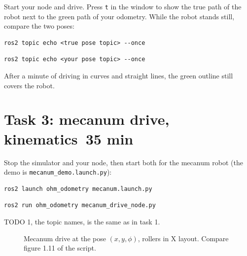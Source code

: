 \documentclass[11pt,a4paper,parskip=half]{scrartcl}
\newcommand{\thema}[1]{\texttt{#1}}
\newcommand{\minutes}[1]{\hfill{\normalsize\mdseries\color{ohmgrey}\faClock[regular]~#1 min}}
\begin{document}
Start your node and drive. Press \thema{t} in the window to show the true path of the robot next to
the green path of your odometry. While the robot stands still, compare the two poses:
\begin{lstlisting}
ros2 topic echo <true pose topic> --once
\end{lstlisting}
\begin{lstlisting}
ros2 topic echo <your pose topic> --once
\end{lstlisting}

\begin{checkpoint}
After a minute of driving in curves and straight lines, the green outline still covers the robot.
\end{checkpoint}

\newpage
\section{Task 3: mecanum drive, kinematics\minutes{35}}
\label{sec:task3}
Stop the simulator and your node, then start both for the mecanum robot (the demo is
\thema{mecanum\_demo.launch.py}):
\begin{lstlisting}
ros2 launch ohm_odometry mecanum.launch.py
\end{lstlisting}
\begin{lstlisting}
ros2 run ohm_odometry mecanum_drive_node.py
\end{lstlisting}
TODO 1, the topic names, is the same as in task 1.

\begin{figure}[ht]
  \centering
  \resizebox{0.62\linewidth}{!}{}
  \caption{Mecanum drive at the pose \((x, y, \phi)\), rollers in X layout. Compare figure 1.11 of the
    script.}
  \label{fig:mecanum}
\end{figure}
\end{document}
